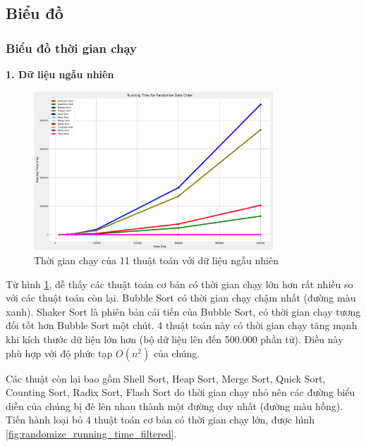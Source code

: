\subsection{Biểu đồ}
\subsubsection{Biểu đồ thời gian chạy}

\textbf{1. Dữ liệu ngẫu nhiên}

\begin{figure}[H]
    \centering
    \includegraphics[width=0.8\textwidth]{exprimental_result/images/randomize_running_time.png}
    \caption{Thời gian chạy của 11 thuật toán với dữ liệu ngẫu nhiên}
    \label{fig:randomize_running_time}
\end{figure}

Từ hình \ref{fig:randomize_running_time}, dễ thấy các thuật toán cơ bản có thời gian chạy lớn hơn rất nhiều so với các thuật toán còn lại. Bubble Sort có thời gian chạy chậm nhất (đường màu xanh). Shaker Sort là phiên bản cải tiến của Bubble Sort, có thời gian chạy tương đối tốt hơn Bubble Sort một chút. 4 thuật toán này có thời gian chạy tăng mạnh khi kích thước dữ liệu lớn hơn (bộ dữ liệu lên đến 500.000 phần tử). Điều này phù hợp với độ phức tạp $O(n^2)$ của chúng.


Các thuật còn lại bao gồm Shell Sort, Heap Sort, Merge Sort, Quick Sort, Counting Sort, Radix Sort, Flash Sort do thời gian chạy nhỏ nên các đường biểu diễn của chúng bị đè lên nhau thành một đường duy nhất (đường màu hồng). Tiến hành loại bỏ 4 thuật toán cơ bản có thời gian chạy lớn, được hình \ref{fig:randomize_running_time_filtered}.


